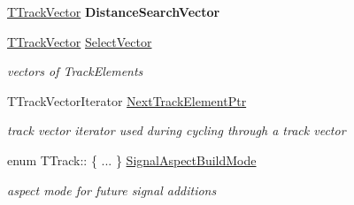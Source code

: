 \begin{DoxyCompactItemize}
\mbox{\label{class_t_track_a5a8edb559dc624c4bcab8ac2d61d83eb}} 
\mbox{\hyperlink{class_t_track_ac64e15050a0faf07c1b7410d60cbcbe5}{T\+Track\+Vector}} {\bfseries Distance\+Search\+Vector}
\item 
\mbox{\label{class_t_track_aa1317775189eeb24f2f2190789243fce}} 
\mbox{\hyperlink{class_t_track_ac64e15050a0faf07c1b7410d60cbcbe5}{T\+Track\+Vector}} \mbox{\hyperlink{class_t_track_aa1317775189eeb24f2f2190789243fce}{Select\+Vector}}
\begin{DoxyCompactList}\small\item\em vectors of Track\+Elements \end{DoxyCompactList}\item 
\mbox{\label{class_t_track_a5a3eca45e68b0b2d5604b096e26d79f5}} 
T\+Track\+Vector\+Iterator \mbox{\hyperlink{class_t_track_a5a3eca45e68b0b2d5604b096e26d79f5}{Next\+Track\+Element\+Ptr}}
\begin{DoxyCompactList}\small\item\em track vector iterator used during cycling through a track vector \end{DoxyCompactList}\item 
\mbox{\label{class_t_track_ab012f6fbdca9a4a0354885c557f41736}} 
enum T\+Track\+:: \{ ... \}  \mbox{\hyperlink{class_t_track_ab012f6fbdca9a4a0354885c557f41736}{Signal\+Aspect\+Build\+Mode}}
\begin{DoxyCompactList}\small\item\em aspect mode for future signal additions \end{DoxyCompactList}\end{DoxyCompactItemize}
